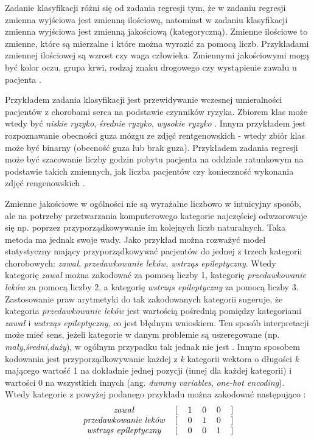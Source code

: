 \documentclass[notitlepage]{report}
\begin{document}
Zadanie klasyfikacji różni się od zadania regresji tym, że w zadaniu regresji zmienna wyjściowa jest zmienną ilościową, natomiast w zadaniu klasyfikacji zmienna wyjściowa jest zmienną jakościową (kategoryczną). Zmienne ilościowe to zmienne, które są mierzalne i które można wyrazić za pomocą liczb. Przykładami zmiennej ilościowej są wzrost czy waga człowieka. Zmiennymi jakościowymi mogą być kolor oczu, grupa krwi, rodzaj znaku drogowego czy wystąpienie zawału u pacjenta  \cite{islr} \cite{eslii}. 

Przykładem zadania klasyfikacji jest przewidywanie wczesnej umieralności pacjentów z chorobami serca na podstawie czynników ryzyka. Zbiorem klas może wtedy być \textit{niskie ryzyko}, \textit{średnie ryzyko}, \textit{wysokie ryzyko} \cite{nashef}. Innym przykładem jest rozpoznawanie obecności guza mózgu ze zdjęć rentgenowskich - wtedy zbiór klas może być binarny (obecność guza lub brak guza). Przykładem zadania regresji może być szacowanie liczby godzin pobytu pacjenta na oddziale ratunkowym na podstawie takich zmiennych, jak liczba pacjentów czy konieczność wykonania zdjęć rengenowskich \cite{combes}.

Zmienne jakościowe w ogólności nie są wyrażalne liczbowo w intuicyjny sposób, ale na potrzeby przetwarzania komputerowego kategorie najczęściej odwzorowuje się np. poprzez przyporządkowywanie im kolejnych liczb naturalnych. Taka metoda ma jednak swoje wady. Jako przykład można rozważyć model statystyczny mający przyporządkowywać pacjentów do jednej z trzech kategorii chorobowych: \textit{zawał}, \textit{przedawkowanie leków}, \textit{wstrząs epileptyczny}. Wtedy kategorię \textit{zawał} można zakodować za pomocą liczby 1, kategorię \textit{przedawkowanie leków} za pomocą liczby 2, a kategorię \textit{wstrząs epileptyczny} za pomocą liczby 3. Zastosowanie praw arytmetyki do tak zakodowanych kategorii sugeruje,  że kategoria \textit{przedawkowanie leków} jest wartością pośrednią pomiędzy kategoriami \textit{zawał} i \textit{wstrząs epileptyczny}, co jest błędnym wnioskiem. Ten sposób interpretacji może mieć sens, jeżeli kategorie w danym problemie są uszeregowane (np. \textit{mały},\textit{średni},\textit{duży}), w ogólnym przypadku tak jednak nie jest \cite{islr}. Innym sposobem kodowania jest przyporządkowywanie każdej z \textit{k} kategorii wektora o długości \textit{k} mającego wartość 1 na dokładnie jednej pozycji (innej dla każdej kategorii) i wartości 0 na wszystkich innych (ang. \textit{dummy variables}, \textit{one-hot encoding}). Wtedy kategorie z powyżej podanego przykładu można zakodować następująco \cite{garavaglia} \cite{islr} \cite{potdar}: 
\begin{equation*}
\begin{blockarray}{*{6}{c}}
\begin{block}{*{6}{c}}
\hbox{\textit{zawał}}     &  [ & 1 & 0 & 0 & ] \\
\hbox{\textit{przedawkowanie leków}}     &  [ & 0 & 1 & 0 & ] \\
\hbox{\textit{wstrząs epileptyczny}} &  [ & 0 & 0 & 1 & ] \\
\end{block}
\end{blockarray}
\end{equation*}
\end{document}
